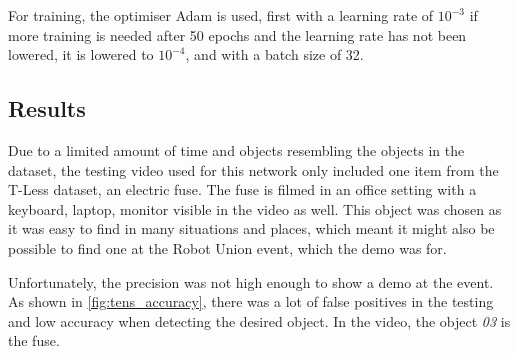 For training, the optimiser Adam is used, first with a learning rate of $ 10^{-3} $ if more training is needed after 50 epochs and the learning rate has not been lowered, it is lowered to $ 10^{-4} $, and with a batch size of 32. 

\subsection{Results}
Due to a limited amount of time and objects resembling the objects in the dataset, the testing video used for this network only included one item from the T-Less dataset, an electric fuse. The fuse is filmed in an office setting with a keyboard, laptop, monitor visible in the video as well. This object was chosen as it was easy to find in many situations and places, which meant it might also be possible to find one at the Robot Union event, which the demo was for.

Unfortunately, the precision was not high enough to show a demo at the event. As shown in \autoref{fig:tens_accuracy}, there was a lot of false positives in the testing and low accuracy when detecting the desired object. In the video, the object \textit{03} is the fuse.

